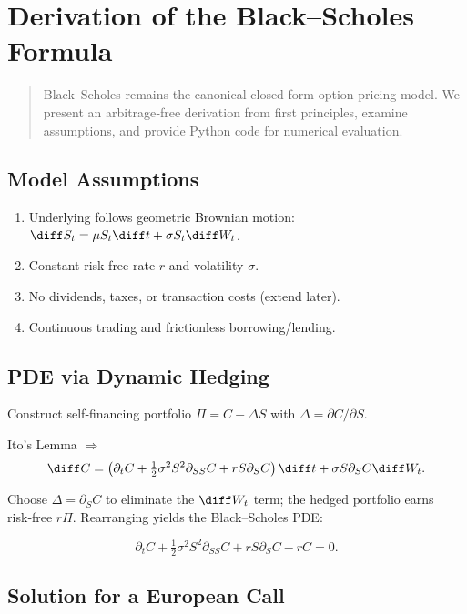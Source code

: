 \chapter{Derivation of the Black--Scholes Formula}\label{ch:bs}

\begin{abstract}
Black--Scholes remains the canonical closed‑form option‑pricing model.
We present an arbitrage‑free derivation from first principles, examine
assumptions, and provide Python code for numerical evaluation.
\end{abstract}

\section{Model Assumptions}

\begin{enumerate}
  \item Underlying follows geometric Brownian motion:
        \(\diff S_t = \mu S_t \diff t + \sigma S_t \diff W_t\).
  \item Constant risk‑free rate \(r\) and volatility \(\sigma\).
  \item No dividends, taxes, or transaction costs (extend later).
  \item Continuous trading and frictionless borrowing/lending.
\end{enumerate}

\section{PDE via Dynamic Hedging}

Construct self‑financing portfolio
\(\Pi = C - \Delta S\) with \(\Delta = \partial C/\partial S\).

Ito’s Lemma \(\Rightarrow\)
\[
\diff C = \left(\partial_t C + \tfrac12 \sigma^2 S^2 \partial_{SS} C
               + r S \partial_S C\right)\diff t + \sigma S \partial_S C \diff W_t .
\]

Choose \(\Delta = \partial_S C\) to eliminate the \( \diff W_t \) term; the
hedged portfolio earns risk‑free \(r\Pi\).  Rearranging yields the
Black--Scholes PDE:

\[
\partial_t C + \tfrac12 \sigma^2 S^2 \partial_{SS} C
 + r S \partial_S C - r C = 0 .
\]

\section{Solution for a European Call}

